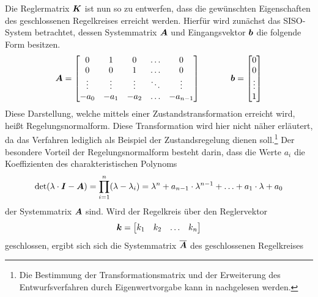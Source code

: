 Die Reglermatrix $\boldsymbol{K}$ ist nun so zu entwerfen, dass die gewünschten Eigenschaften des geschlossenen Regelkreises erreicht werden. Hierfür wird zunächst das SISO-System  betrachtet, dessen Systemmatrix $\boldsymbol{A}$ und Eingangsvektor $\boldsymbol{b}$ die folgende Form besitzen.
\begin{equation}
\boldsymbol{A} = \begin{bmatrix}
0 & 1 & 0 & \hdots & 0 \\
0 & 0 & 1 & \hdots & 0 \\
\vdots & \vdots & \vdots & \ddots & \vdots \\
-a_{\text{0}} & -a_{\text{1}} & -a_{\text{2}} & \hdots & -a_{n-1}
\end{bmatrix}
\hspace{35pt}
\boldsymbol{b} = \begin{bmatrix}
0 \\ 0 \\ \vdots \\ 1
\end{bmatrix}
\end{equation}
Diese Darstellung, welche mittels einer Zustandstransformation erreicht wird, heißt Regelungsnormalform. Diese Transformation wird hier nicht näher erläutert, da das Verfahren lediglich als Beispiel der Zustandsregelung dienen soll.\footnote{Die Bestimmung der Transformationsmatrix und der Erweiterung des Entwurfsverfahren durch Eigenwertvorgabe kann in \cite[S. 245]{LunzeRT2} nachgelesen werden.} Der besondere Vorteil der Regelungsnormalform besteht darin, dass die Werte $a_i$ die Koeffizienten des charakteristischen Polynoms 
\begin{equation}
\text{det}(\lambda\cdot \boldsymbol{I}-\boldsymbol{A}) = \prod^n_{i=1} (\lambda-\lambda_i) = \lambda^n+a_{n-1}\cdot \lambda^{n-1} + \hdots + a_{\text{1}}\cdot \lambda + a_{\text{0}}
\end{equation}
der Systemmatrix $\boldsymbol{A}$ sind. Wird der Regelkreis über den Reglervektor
\begin{equation}
\boldsymbol{k} = \begin{bmatrix}
k_1 & k_2 & \hdots & k_n
\end{bmatrix}
\end{equation}
geschlossen, ergibt sich sich die  Systemmatrix $\boldsymbol{\overline{A}}$ des geschlossenen Regelkreises
